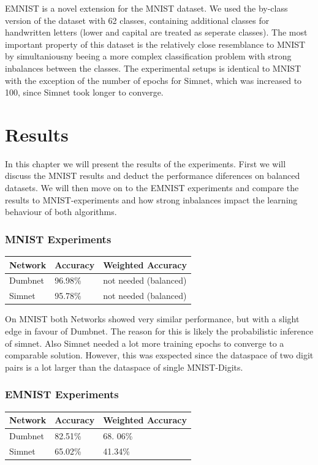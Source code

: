 \documentclass[a4paper,pt12]{article}
\begin{document}
EMNIST is a novel extension for the MNIST dataset. We used the by-class version of the dataset with 62 classes, containing additional classes for handwritten letters (lower and capital are treated as seperate classes). The most important property of this dataset is the relatively close resemblance to MNIST by simultaniousny beeing a more complex classification problem with strong inbalances between the classes. \newline
The experimental setups is identical to MNIST with the exception of the number of epochs for Simnet, which was increased to 100, since Simnet took longer to converge.

\section{Results}
In this chapter we will present the results of the experiments. First we will discuss the MNIST results and deduct the performance diferences on balanced datasets. We will then move on to the EMNIST experiments and compare the results to MNIST-experiments and how strong inbalances impact the learning behaviour of both algorithms.

\subsubsection{MNIST Experiments}
\begin{center}
    \begin{tabular}{| l | l | l | }
    \hline
    Network & Accuracy & Weighted Accuracy \\ \hline
    Dumbnet & 96.98\% & not needed (balanced) \\ \hline
	Simnet & 95.78\% & not needed (balanced) \\ \hline
    \end{tabular}
\end{center}

On MNIST both Networks showed very similar performance, but with a slight edge in favour of Dumbnet. The reason for this is likely the probabilistic inference of simnet. Also Simnet needed a lot more training epochs to converge to a comparable solution. However, this was exspected since the dataspace of two digit pairs is a lot larger than the dataspace of single MNIST-Digits. 

\subsubsection{EMNIST Experiments}
\begin{center}
    \begin{tabular}{| l | l | l | }
    \hline
    Network & Accuracy & Weighted Accuracy \\ \hline
    Dumbnet & 82.51\% & 68.
    06\% \\ \hline
	Simnet & 65.02\% & 41.34\% \\ \hline
    \end{tabular}
\end{center}
\end{document}
